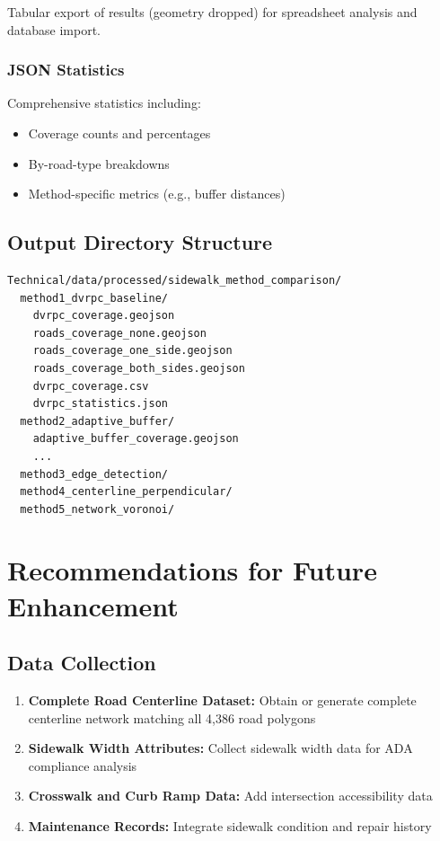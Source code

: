 \documentclass[11pt,letterpaper]{article}
\begin{document}
Tabular export of results (geometry dropped) for spreadsheet analysis and database import.

\subsubsection{JSON Statistics}

Comprehensive statistics including:
\begin{itemize}
    \item Coverage counts and percentages
    \item By-road-type breakdowns
    \item Method-specific metrics (e.g., buffer distances)
\end{itemize}

\subsection{Output Directory Structure}

\begin{verbatim}
Technical/data/processed/sidewalk_method_comparison/
  method1_dvrpc_baseline/
    dvrpc_coverage.geojson
    roads_coverage_none.geojson
    roads_coverage_one_side.geojson
    roads_coverage_both_sides.geojson
    dvrpc_coverage.csv
    dvrpc_statistics.json
  method2_adaptive_buffer/
    adaptive_buffer_coverage.geojson
    ...
  method3_edge_detection/
  method4_centerline_perpendicular/
  method5_network_voronoi/
\end{verbatim}

\section{Recommendations for Future Enhancement}

\subsection{Data Collection}

\begin{enumerate}
    \item \textbf{Complete Road Centerline Dataset:} Obtain or generate complete centerline network matching all 4,386 road polygons
    \item \textbf{Sidewalk Width Attributes:} Collect sidewalk width data for ADA compliance analysis
    \item \textbf{Crosswalk and Curb Ramp Data:} Add intersection accessibility data
    \item \textbf{Maintenance Records:} Integrate sidewalk condition and repair history
\end{enumerate}
\end{document}
